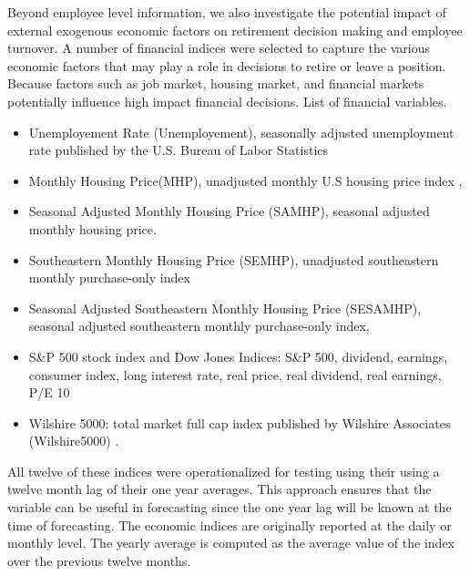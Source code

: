 \documentclass[12pt,letterpaper]{article}
\begin{document}
Beyond employee level information, we also investigate the potential impact of external exogenous economic factors on retirement decision making and employee turnover.  A number of financial indices were selected to capture the various economic factors that may play a role in decisions to retire or leave a position.  Because factors such as job market, housing market, and financial markets potentially influence high impact financial decisions.
List of financial variables.
\begin{itemize}
	\item Unemployement Rate (Unemployement),  seasonally adjusted unemployment rate published by the U.S. Bureau of Labor Statistics \citep{unemployment}
	\item Monthly Housing Price(MHP), unadjusted monthly U.S housing price index \citep{HPI},
	\item Seasonal Adjusted Monthly Housing Price (SAMHP), seasonal adjusted monthly housing price.
	\item Southeastern Monthly Housing Price (SEMHP), unadjusted southeastern monthly purchase-only index
	\item Seasonal Adjusted Southeastern Monthly Housing Price (SESAMHP), seasonal adjusted southeastern monthly purchase-only index,
	\item S\&P 500 stock index and Dow Jones Indices: S\&P 500, dividend, earnings, consumer index, long interest rate, real price, real dividend, real earnings, P/E 10 \citep{sp500}
    \item Wilshire 5000: total market full cap index published by Wilshire Associates (Wilshire5000) \citep{will5000}.
\end{itemize}
All twelve of these indices were operationalized for testing using their using a twelve month lag of their one year averages.  This approach ensures that the variable can be useful in forecasting since the one year lag will be known at the time of forecasting.  The economic indices are originally reported at the daily or monthly level. The yearly average is computed as the average value of the index over the previous twelve months.

\end{document}
